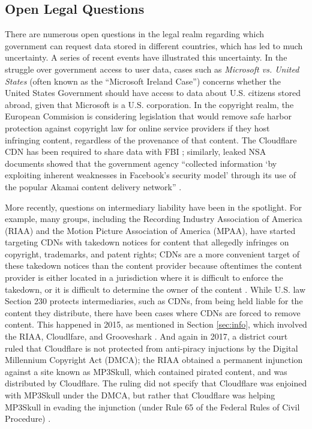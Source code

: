 \subsection{Open Legal Questions}
There are numerous open questions in the legal realm regarding which government can request data stored in different countries, which 
has led to much uncertainty.  A series of recent events have illustrated this uncertainty.  In the struggle over government access to 
user data, cases such as {\it Microsoft vs. United States} (often known as the ``Microsoft Ireland Case'') concerns whether the United 
States Government should have access to data about U.S. citizens stored abroad, given that Microsoft is a U.S. corporation.  In the 
copyright realm, the European Commision is considering legislation that would remove safe harbor protection against copyright law for 
online service providers if they host infringing content, regardless of the provenance of that content.  The Cloudflare CDN has been required
to share data with FBI \cite{cloudflare_nsl}; similarly, leaked NSA documents showed that the government agency ``collected information `by exploiting inherent 
weaknesses in Facebook's security model' through its use of the popular Akamai content delivery network'' \cite{facebook_surv}.

More recently, questions on intermediary liability have been in the spotlight.  For example, many groups, including the Recording Industry 
Association of America (RIAA) and the Motion Picture Association of America (MPAA), have started targeting CDNs with takedown notices for 
content that allegedly infringes on copyright, trademarks, and patent rights; CDNs are a more convenient target of these takedown notices than 
the content provider because oftentimes the content provider is either located in a jurisdiction where it is difficult to enforce the takedown, 
or it is difficult to determine the owner of the content \cite{medium_copyright,eff_copyright}.  While U.S. law Section 230 protects intermediaries, such as CDNs, from being held 
liable for the content they distribute, there have been cases where CDNs are forced to remove content.  This happened in 2015, as mentioned in Section \ref{sec:info}, which 
involved the RIAA, Cloudlfare, and Grooveshark \cite{techdirt_copyright}.  
And again in 2017, a district court ruled that Cloudflare is not protected from anti-piracy injuctions by the Digital Millennium Copyright Act (DMCA); the 
RIAA obtained a permanent injunction against a site known as MP3Skull, which contained pirated content, and was distributed by Cloudflare.  The ruling 
did not specify that Cloudflare was enjoined with MP3Skull under the DMCA, but rather that Cloudflare was helping MP3Skull in evading the injunction (under 
Rule 65 of the Federal Rules of Civil Procedure) \cite{stack_copyright}.

